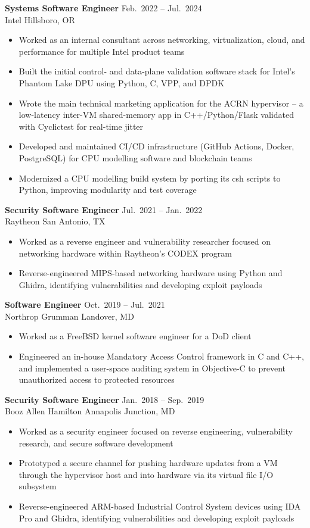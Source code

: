\documentclass[letterpaper,10pt]{article}
\newcommand{\job}[4]{%
  \textbf{#1} \hfill #2\\
  #3 \hfill #4\vspace{-2pt}}
\begin{document}
\job{Systems Software Engineer}{Feb.\ 2022 -- Jul.\ 2024}{Intel}{Hillsboro, OR}
\begin{itemize}
  \item Worked as an internal consultant across networking, virtualization, cloud, and performance for multiple Intel product teams
  \item Built the initial control- and data-plane validation software stack for Intel's Phantom Lake DPU using Python, C, VPP, and DPDK
  \item Wrote the main technical marketing application for the ACRN hypervisor -- a low-latency inter-VM shared-memory app in C++/Python/Flask validated with Cyclictest for real-time jitter
  \item Developed and maintained CI/CD infrastructure (GitHub Actions, Docker, PostgreSQL) for CPU modelling software and blockchain teams
  \item Modernized a CPU modelling build system by porting its csh scripts to Python, improving modularity and test coverage
\end{itemize}
\vspace{3pt}

\job{Security Software Engineer}{Jul.\ 2021 -- Jan.\ 2022}{Raytheon}{San Antonio, TX}
\begin{itemize}
  \item Worked as a reverse engineer and vulnerability researcher focused on networking hardware within Raytheon's CODEX program
  \item Reverse-engineered MIPS-based networking hardware using Python and Ghidra, identifying vulnerabilities and developing exploit payloads
\end{itemize}
\vspace{3pt}

\job{Software Engineer}{Oct.\ 2019 -- Jul.\ 2021}{Northrop Grumman}{Landover, MD}
\begin{itemize}
  \item Worked as a FreeBSD kernel software engineer for a DoD client
  \item Engineered an in-house Mandatory Access Control framework in C and C++, and implemented a user-space auditing system in Objective-C to prevent unauthorized access to protected resources
\end{itemize}
\vspace{3pt}

\job{Security Software Engineer}{Jan.\ 2018 -- Sep.\ 2019}{Booz Allen Hamilton}{Annapolis Junction, MD}
\begin{itemize}
  \item Worked as a security engineer focused on reverse engineering, vulnerability research, and secure software development
  \item Prototyped a secure channel for pushing hardware updates from a VM through the hypervisor host and into hardware via its virtual file I/O subsystem
  \item Reverse-engineered ARM-based Industrial Control System devices using IDA Pro and Ghidra, identifying vulnerabilities and developing exploit payloads
\end{itemize}
\vspace{3pt}
\end{document}

